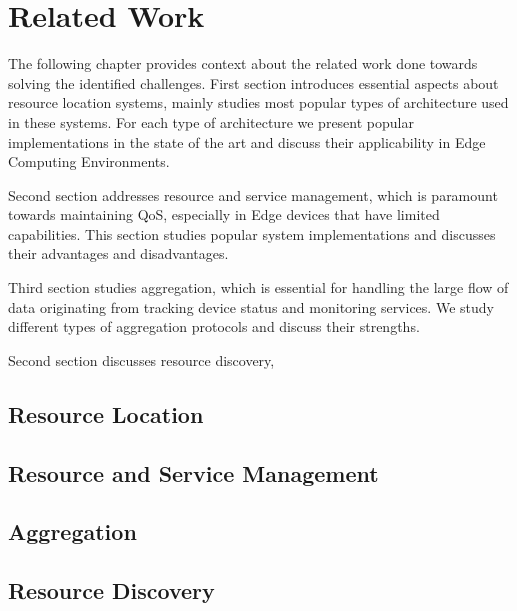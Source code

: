 \chapter{Related Work} \label{cha:related_work}

The following chapter provides context about the related work done towards solving the identified challenges. First section introduces essential aspects about resource location systems, mainly studies most popular types of architecture used in these systems. For each type of architecture we present popular implementations in the state of the art and discuss their applicability in Edge Computing Environments. 

Second section addresses resource and service management, which is paramount towards maintaining QoS, especially in Edge devices that have limited capabilities. This section studies popular system implementations and discusses their advantages and disadvantages.

Third section studies aggregation, which is essential for handling the large flow of data originating from tracking device status and monitoring services. We study different types of aggregation protocols and discuss their strengths.

Second section discusses resource discovery, 

 

\section{Resource Location} \label{sec:res_location} 

\section{Resource and Service Management} \label{sec:res_management} 

\section{Aggregation} \label{sec:aggregation} 

\section{Resource Discovery} \label{sec:res_discovery} 


